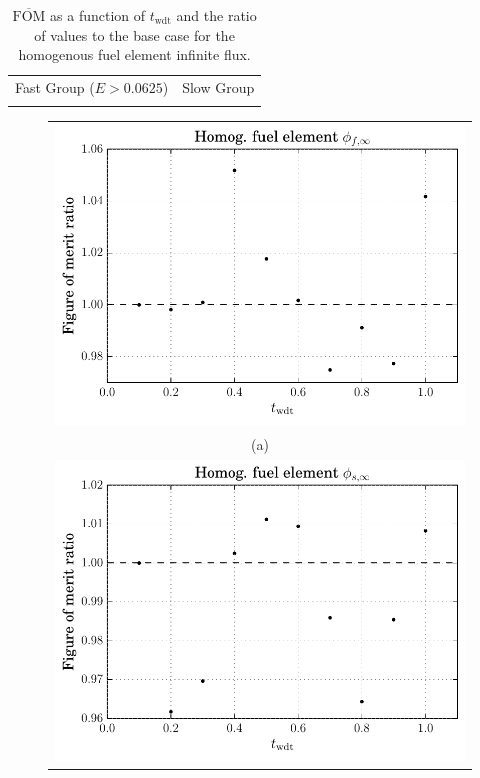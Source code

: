 \begin{table}[hbtp]
  \centering
  \caption[$\overline{\mathrm{FOM}}$ and ratio for
    the homogenous fuel element infinite flux.]{$\overline{\mathrm{FOM}}$ as a function of
    $t_{\mathrm{wdt}}$ and the ratio of values to the base case for
    the homogenous fuel element infinite flux.}
  \begin{tabular}{cc} Fast Group ($E > 0.0625$) & Slow Group \\
    
 &
   
  \end{tabular}
\label{tab:homog_inf_flx}
\end{table}
\begin{figure}[hbtp]
  \centering
  \begin{tabular}{c}
  \includegraphics[scale=0.9]{images/results/homog_inf_flx_grp_comb1} \\
    (a) \\
  \includegraphics[scale=0.9]{images/results/homog_inf_flx_grp_comb2} \\

\end{tabular}
\end{figure}
